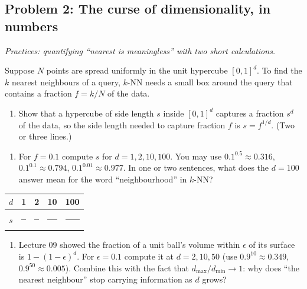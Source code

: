 \documentclass[
  11pt,
]{article}
\newcounter{none} %
\providecommand{\tightlist}{%
  \setlength{\itemsep}{0pt}\setlength{\parskip}{0pt}}
\newcommand{\answerspace}[1]{\par\vspace*{#1}}  %
\newcommand{\blank}[1][1.2in]{\rule{#1}{0.4pt}}
\newcommand{\answerpage}{\clearpage}
\begin{document}
\answerpage

\subsection{Problem 2: The curse of dimensionality, in
numbers}\label{problem-2-the-curse-of-dimensionality-in-numbers}

\emph{Practices: quantifying ``nearest is meaningless'' with two short
calculations.}

Suppose \(N\) points are spread uniformly in the unit hypercube
\([0,1]^d\). To find the \(k\) nearest neighbours of a query, \(k\)-NN
needs a small box around the query that contains a fraction \(f = k/N\)
of the data.

\begin{enumerate}
\def\labelenumi{(\alph{enumi})}
\tightlist
\item
  Show that a hypercube of side length \(s\) inside \([0,1]^d\) captures
  a fraction \(s^d\) of the data, so the side length needed to capture
  fraction \(f\) is \(s = f^{1/d}\). (Two or three lines.)
\end{enumerate}

\answerspace{3.8in}

\begin{enumerate}
\def\labelenumi{(\alph{enumi})}
\setcounter{enumi}{1}
\tightlist
\item
  For \(f = 0.1\) compute \(s\) for \(d = 1, 2, 10, 100\). You may use
  \(0.1^{0.5} \approx 0.316\), \(0.1^{0.1} \approx 0.794\),
  \(0.1^{0.01} \approx 0.977\). In one or two sentences, what does the
  \(d = 100\) answer mean for the word ``neighbourhood'' in \(k\)-NN?
\end{enumerate}

{\def\LTcaptype{none} %
\begin{longtable}[]{@{}lllll@{}}
\toprule\noalign{}
\(d\) & 1 & 2 & 10 & 100 \\
\midrule\noalign{}
\endhead
\bottomrule\noalign{}
\endlastfoot
\(s\) & \blank[0.8in] & \blank[0.8in] & \blank[0.8in] & \blank[0.8in] \\
\end{longtable}
}

\answerspace{1.2in}
\answerpage

\begin{enumerate}
\def\labelenumi{(\alph{enumi})}
\setcounter{enumi}{2}
\tightlist
\item
  Lecture 09 showed the fraction of a unit ball's volume within
  \(\epsilon\) of its surface is \(1 - (1-\epsilon)^d\). For
  \(\epsilon = 0.1\) compute it at \(d = 2, 10, 50\) (use
  \(0.9^{10} \approx 0.349\), \(0.9^{50} \approx 0.005\)). Combine this
  with the fact that \(d_{\max}/d_{\min} \to 1\): why does ``the nearest
  neighbour'' stop carrying information as \(d\) grows?
\end{enumerate}
\end{document}
